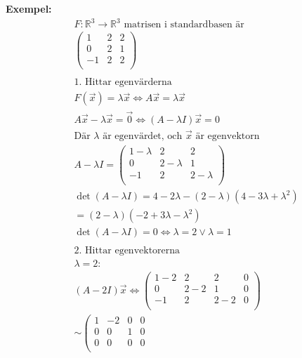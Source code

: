 \begin{multicols}{2}
\textbf{Exempel:}
\begin{align*}
  &F:\mathbb{R}^3\to\mathbb{R}^3 \text{ matrisen i standardbasen är} \\
  &\left(\begin{array}{ccc}
    1 & 2 & 2  \\
    0 & 2 & 1  \\
   -1 & 2 & 2  \\
  \end{array}\right) \\
  &\\
  &\text{1. Hittar egenvärderna} \\
  &F (\vec{x}) = \lambda\vec{x} \Leftrightarrow{} A\vec{x}=\lambda\vec{x} \\
  &A\vec{x}-\lambda\vec{x} = \vec{0} \Leftrightarrow{} (A-\lambda{I})\vec{x} = 0 \\
  &\text{Där $\lambda$ är egenvärdet, och $\vec{x}$ är egenvektorn} \\
  &A-\lambda{I} =
  \left(\begin{array}{ccc}
    1-\lambda & 2         & 2          \\
    0         & 2-\lambda & 1          \\
   -1         & 2         & 2-\lambda  \\
  \end{array}\right) \\
  &\det(A-\lambda{I}) = 4 -2\lambda{} -(2 -\lambda)(4 -3\lambda+\lambda^2) \\
  &= (2-\lambda)(-2 +3\lambda -\lambda^2) \\
  &\det(A-\lambda{I}) = 0 \Leftrightarrow{} \lambda=2 \lor{} \lambda=1 \\
  &\\
  &\text{2. Hittar egenvektorerna} \\
  &\lambda=2: \\
  &(A-2I)\vec{x} \Leftrightarrow{}
  \left(\begin{array}{ccc|c}
    1-2 & 2   & 2   & 0 \\
    0   & 2-2 & 1   & 0 \\
   -1   & 2   & 2-2 & 0 \\
  \end{array}\right) \\
  &\sim{}
  \left(\begin{array}{ccc|c}
    1 & -2 & 0 & 0 \\
    0 &  0 & 1 & 0 \\
    0 &  0 & 0 & 0 \\

\end{array}
\end{align*}
\end{multicols}
